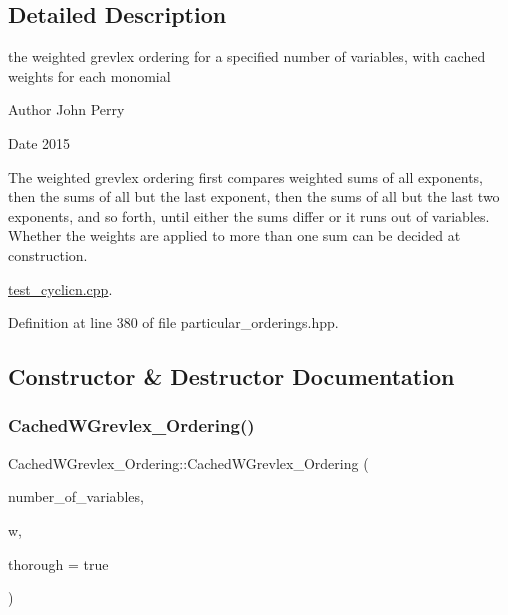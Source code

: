 \subsection{Detailed Description}
the weighted grevlex ordering for a specified number of variables, with cached weights for each monomial 

\begin{DoxyAuthor}{Author}
John Perry 
\end{DoxyAuthor}
\begin{DoxyDate}{Date}
2015
\end{DoxyDate}
The weighted grevlex ordering first compares weighted sums of all exponents, then the sums of all but the last exponent, then the sums of all but the last two exponents, and so forth, until either the sums differ or it runs out of variables. Whether the weights are applied to more than one sum can be decided at construction. \begin{Desc}
\item[Examples\+: ]\par
\hyperlink{test_cyclicn_8cpp-example}{test\+\_\+cyclicn.\+cpp}.\end{Desc}


Definition at line 380 of file particular\+\_\+orderings.\+hpp.



\subsection{Constructor \& Destructor Documentation}
\mbox{\label{class_cached_w_grevlex___ordering_a107617c77aaebe5ba74973af66ab75b6}} 
\subsubsection{\texorpdfstring{Cached\+W\+Grevlex\+\_\+\+Ordering()}{CachedWGrevlex\_Ordering()}}
{\footnotesize\ttfamily Cached\+W\+Grevlex\+\_\+\+Ordering\+::\+Cached\+W\+Grevlex\+\_\+\+Ordering (\begin{DoxyParamCaption}\item[{N\+V\+A\+R\+\_\+\+T\+Y\+PE}]{number\+\_\+of\+\_\+variables,  }\item[{W\+T\+\_\+\+T\+Y\+PE $\ast$}]{w,  }\item[{bool}]{thorough = {\ttfamily true} }\end{DoxyParamCaption})}



